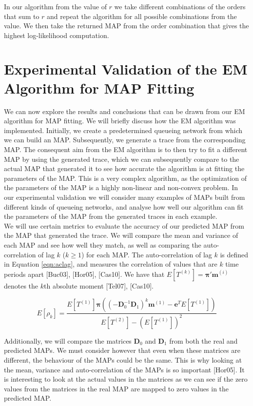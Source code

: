\documentclass[a4paper,11pt,titlepage]{article}
\begin{document}
In our algorithm from the value of $r$ we take different combinations of the orders that sum to $r$ and repeat the algorithm for all possible combinations from the value. We then take the returned MAP from the order combination that gives the highest log-likelihood computation. 

\section{Experimental Validation of the EM Algorithm for MAP Fitting}

We can now explore the results and conclusions that can be drawn from our EM algorithm for MAP fitting. We will briefly discuss how the EM algorithm was implemented. Initially, we create a predetermined queueing network from which we can build an MAP. Subsequently, we generate a trace from the corresponding MAP. The consequent aim from the EM algorithm is to then try to fit a different MAP by using the generated trace, which we can subsequently compare to the actual MAP that generated it to see how accurate the algorithm is at fitting the parameters of the MAP. This is a very complex algorithm, as the optimization of the parameters of the MAP is a highly non-linear and non-convex problem. In our experimental validation we will consider many examples of MAPs built from different kinds of queueing networks, and analyse how well our algorithm can fit the parameters of the MAP from the generated traces in each example. \\

We will use certain metrics to evaluate the accuracy of our predicted MAP from the MAP that generated the trace. We will compare the mean and variance of each MAP and see how well they match, as well as comparing the auto-correlation of lag $k$ ($k \geq 1$) for each MAP. The auto-correlation of lag  $k$ is defined in Equation \ref{eqn:aclag}, and measures the correlation of values that are $k$ time periods apart [Buc03], [Hor05], [Cas10]. We have that $E[T^{(k)}] = \bm{\pi'} \mathbf{m}^{(i)}$ denotes the $k$th absolute moment [Tel07], [Cas10]. 

\begin{equation}
    E[\rho_k] = \frac{E[T^{(1)}] \bm{\pi} \left( (-\mathbf{D}_0^{-1} \mathbf{D}_1)^k \mathbf{m}^{(1)} - \mathbf{e}^T E[T^{(1)}] \right)}{E[T^{(2)}] - \left(E[T^{(1)}]\right)^2}
    \label{eqn:aclag}
\end{equation}

Additionally, we will compare the matrices $\mathbf{D}_0$ and $\mathbf{D}_1$ from both the real and predicted MAPs. We must consider however that even when these matrices are different, the behaviour of the MAPs could be the same. This is why looking at the mean, variance and auto-correlation of the MAPs is so important [Hor05]. It is interesting to look at the actual values in the matrices as we can see if the zero values from the matrices in the real MAP are mapped to zero values in the predicted MAP. 
\end{document}
